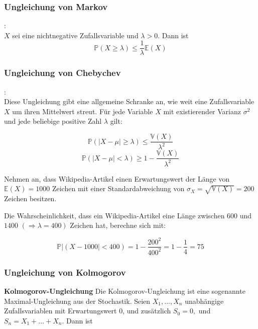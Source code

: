 {    \subsubsection{Ungleichung von Markov}
    \begin{definition}:\\
    $X$ sei eine nichtnegative Zufallsvariable und  $\lambda>0$. Dann ist
    \[
    \mathbb P\left(X\ge \lambda \right)\le \frac{1}{\lambda }\mathbb E(X)
    \]
    \end{definition}

    \subsubsection{Ungleichung von Chebychev
        }

    \begin{definition}:\\
        Diese Ungleichung gibt eine allgemeine Schranke an, wie weit eine Zufallsvariable 
        $X$ um ihren Mittelwert streut. Für jede Variable $X$ mit existierender Varianz $\sigma^{2}$ und
        jede beliebige positive Zahl $\lambda$ gilt:

        \[\mathbb P\left(\left|X-\mu \right|\ge \lambda \right)\le \frac{\mathbb V(X)}{\lambda^{2}}\]
        \[\mathbb P\left(\left|X-\mu \right|<\lambda \right)\ge 1-\frac{\mathbb V(X)}{\lambda ^{2}}\]
    \end{definition}

    \begin{bsp} Nehmen an, dass Wikipedia-Artikel einen Erwartungswert der Länge von 
    $\mathbb E\left(X\right)=1000$ Zeichen mit einer Standardabweichung von 
    $\sigma_{X}=\sqrt{\mathbb V\left(X\right)}=200$ Zeichen besitzen. 

    Die Wahrscheinlichkeit, dass ein Wikipedia-Artikel eine
    Länge zwischen $600$ und $1400$ $\left(\Rightarrow \lambda=400\right)$ Zeichen hat, berechne sich mit:

    \[
        \mathbb P\left|\left(X-1000\right|<400\right)=1-\frac{200^{2}}{400^{2}}=1-\frac{1}{4}=75
    \]
    \end{bsp}

    \subsubsection{Ungleichung von Kolmogorov
        }
    \begin{definition}\textbf{Kolmogorov-Ungleichung}
    Die Kolmogorov-Ungleichung ist eine sogenannte Maximal-Ungleichung aus
    der Stochastik. Seien $X_{1},... ,X_{n}$ unabhängige Zufallsvariablen mit
    Erwartungswert 0, und zusätzlich $S_{0}=0,$ und $S_{n}=X_{1}+... +X_{n}$. Dann ist


\end{definition}}
